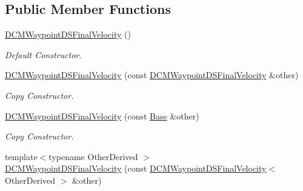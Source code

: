 \subsection*{Public Member Functions}
\begin{DoxyCompactItemize}
\item 
\hyperlink{classow__core_1_1DCMWaypointDSFinalVelocity_a867ec2bf0f6654ebd80c9548748c6752}{D\+C\+M\+Waypoint\+D\+S\+Final\+Velocity} ()\hypertarget{classow__core_1_1DCMWaypointDSFinalVelocity_a867ec2bf0f6654ebd80c9548748c6752}{}\label{classow__core_1_1DCMWaypointDSFinalVelocity_a867ec2bf0f6654ebd80c9548748c6752}

\begin{DoxyCompactList}\small\item\em Default Constructor. \end{DoxyCompactList}\item 
\hyperlink{classow__core_1_1DCMWaypointDSFinalVelocity_a7049f204f6c6cf1d7bda6d18f1b675fc}{D\+C\+M\+Waypoint\+D\+S\+Final\+Velocity} (const \hyperlink{classow__core_1_1DCMWaypointDSFinalVelocity}{D\+C\+M\+Waypoint\+D\+S\+Final\+Velocity} \&other)\hypertarget{classow__core_1_1DCMWaypointDSFinalVelocity_a7049f204f6c6cf1d7bda6d18f1b675fc}{}\label{classow__core_1_1DCMWaypointDSFinalVelocity_a7049f204f6c6cf1d7bda6d18f1b675fc}

\begin{DoxyCompactList}\small\item\em Copy Constructor. \end{DoxyCompactList}\item 
\hyperlink{classow__core_1_1DCMWaypointDSFinalVelocity_a4b42145b8fec9efcb733020f3706d3e1}{D\+C\+M\+Waypoint\+D\+S\+Final\+Velocity} (const \hyperlink{classow__core_1_1LinearVelocity}{Base} \&other)\hypertarget{classow__core_1_1DCMWaypointDSFinalVelocity_a4b42145b8fec9efcb733020f3706d3e1}{}\label{classow__core_1_1DCMWaypointDSFinalVelocity_a4b42145b8fec9efcb733020f3706d3e1}

\begin{DoxyCompactList}\small\item\em Copy Constructor. \end{DoxyCompactList}\item 
{\footnotesize template$<$typename Other\+Derived $>$ }\\\hyperlink{classow__core_1_1DCMWaypointDSFinalVelocity_aa75f4edd88c0cb01bf038975d68fedd6}{D\+C\+M\+Waypoint\+D\+S\+Final\+Velocity} (const \hyperlink{classow__core_1_1DCMWaypointDSFinalVelocity}{D\+C\+M\+Waypoint\+D\+S\+Final\+Velocity}$<$ Other\+Derived $>$ \&other)\hypertarget{classow__core_1_1DCMWaypointDSFinalVelocity_aa75f4edd88c0cb01bf038975d68fedd6}{}\label{classow__core_1_1DCMWaypointDSFinalVelocity_aa75f4edd88c0cb01bf038975d68fedd6}


\end{DoxyCompactItemize}
